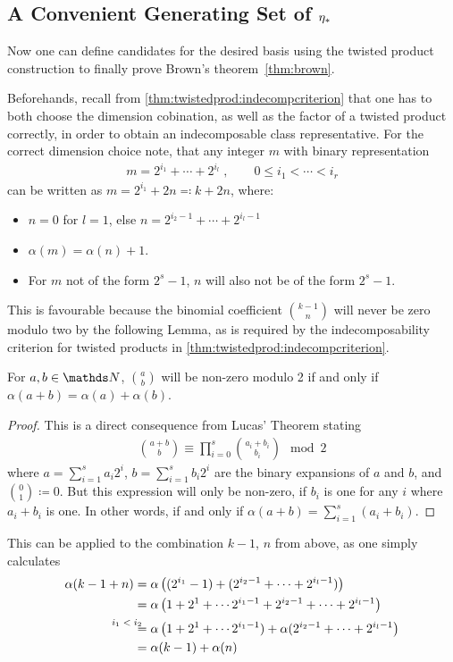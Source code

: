 \subsection
[A Convenient Generating Set of the Cobordism Ring]
{A Convenient Generating Set of $\eta_*$}
Now one can define candidates for the desired basis using the twisted
product construction to finally prove
Brown's theorem~\autoref{thm:brown}. 

Beforehands, recall from \autoref{thm:twistedprod:indecompcriterion}
that one has to both choose the dimension cobination, as well as the
factor of a twisted product correctly, in order to obtain an
indecomposable class representative.
For the correct dimension choice note, that any integer $m$ with
binary representation
\begin{gather*}
  m=2^{i_1}+\dotsb+2^{i_l}
  \;,\qquad
  0 \leq i_1<\dotsb<i_r
\end{gather*}
can be written as $m=2^{i_1}+2n\eqqcolon k+2n$, where:
\begin{itemize}
\item $n=0$ for $l=1$, else $n=2^{i_2-1}+\dotsb+2^{i_l-1}$
\item $\alpha(m)=\alpha(n)+1$.
\item For $m$ not of the form $2^s-1$, $n$ will also not be of the
  form $2^s-1$.
\end{itemize}
This is favourable because the binomial coefficient
$\binom{k-1}{n}$ will never be zero modulo two by the following Lemma,
as is required by the indecomposability criterion for twisted products
in \autoref{thm:twistedprod:indecompcriterion}.
\begin{Lem}
  For $a,b\in\Nat$, $\binom{a}{b}$ will be non-zero modulo 2 if and only
  if $\alpha(a+b)=\alpha(a)+\alpha(b)$.
  \begin{proof}
    This is a direct consequence from Lucas' Theorem %
    stating
    \begin{gather*}
      \binom{a+b}{b} \equiv \prod_{i=0}^s \binom{a_i+b_i}{b_i} \mod 2
    \end{gather*}
    where $a=\sum_{i=1}^s a_i2^{i}$, $b=\sum_{i=1}^s b_i2^{i}$ are the
    binary expansions of $a$ and $b$, and $\binom{0}{1}\coloneqq 0$.
    But this expression will only be non-zero, if $b_i$ is one for any
    $i$ where $a_i+b_i$ is one. In other words, if and only if
    $\alpha(a+b)=\sum_{i=1}^s(a_i+b_i)$.    
  \end{proof}
\end{Lem}
This can be applied to the combination $k-1$, $n$ from above, as one
simply calculates
\begin{align*}
  \alpha(k-1+n)
  &= \alpha\left((2^{i_1}-1)+ (2^{i_2-1}+\dotsb+2^{i_l-1})\right) \\
  &= \alpha\left(1+2^1+\dotsb 2^{i_1-1} + 2^{i_2-1}+\dotsb+2^{i_l-1}\right) \\
  &\equalsby{$i_1<i_2$}
  \alpha\left(1+2^1+\dotsb 2^{i_1-1}) + \alpha(2^{i_2-1}+\dotsb+2^{i_l-1}\right)\\
  &= \alpha(k-1) + \alpha(n)
\end{align*}

